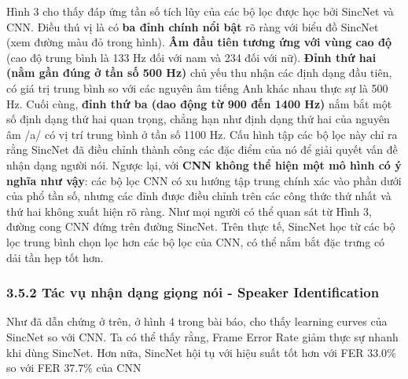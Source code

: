 \documentclass{article}
\begin{document}
	Hình 3 cho thấy đáp ứng tần số tích lũy của các bộ lọc được học bởi SincNet và CNN. Điều thú vị là có \textbf{ba đỉnh chính nổi bật} rõ ràng với biểu đồ SincNet (xem đường màu đỏ trong hình). \textbf{Âm đầu tiên tương ứng với vùng cao độ} (cao độ trung bình là 133 Hz đối với nam và 234 đối với nữ). \textbf{Đỉnh thứ hai (nằm gần đúng ở tần số 500 Hz)} chủ yếu thu nhận các định dạng đầu tiên, có giá trị trung bình so với các nguyên âm tiếng Anh khác nhau thực sự là 500 Hz. Cuối cùng, \textbf{đỉnh thứ ba (dao động từ 900 đến 1400 Hz)} nắm bắt một số định dạng thứ hai quan trọng, chẳng hạn như định dạng thứ hai của nguyên âm /a/ có vị trí trung bình ở tần số 1100 Hz. Cấu hình tập các bộ lọc này chỉ ra rằng SincNet đã điều chỉnh thành công các đặc điểm của nó để giải quyết vấn đề nhận dạng người nói. Ngược lại, với \textbf{CNN không thể hiện một mô hình có ý nghĩa như vậy}: các bộ lọc CNN có xu hướng tập trung chính xác vào phần dưới của phổ tần số, nhưng các đỉnh được điều chỉnh trên các công thức thứ nhất và thứ hai không xuất hiện rõ ràng. Như mọi người có thể quan sát từ Hình 3, đường cong CNN đứng trên đường SincNet. Trên thực tế, SincNet học từ các bộ lọc trung bình chọn lọc hơn các bộ lọc của CNN, có thể nắm bắt đặc trưng có dải tần hẹp tốt hơn.

	\subsubsection{3.5.2 Tác vụ nhận dạng giọng nói - Speaker Identification}
	\qquad Như đã dẫn chứng ở trên, ở hình 4 trong bài báo, cho thấy learning curves của SincNet so với CNN. Ta có thể thấy rằng, Frame Error Rate giảm thực sự nhanh khi dùng SincNet. Hơn nữa, SincNet hội tụ với hiệu suất tốt hơn với FER $33.0\%$ so với FER $37.7\%$ của CNN
	
\end{document}
